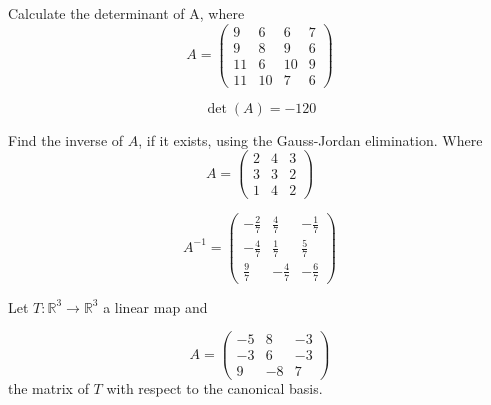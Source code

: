 \begin{questions}

\question Calculate the determinant of A, where
$$
A=\left(\begin{array}{rrrr}
9 & 6 & 6 & 7 \\
9 & 8 & 9 & 6 \\
11 & 6 & 10 & 9 \\
11 & 10 & 7 & 6
\end{array}\right)
$$

\begin{solution}
$$\det(A)=-120$$
\end{solution}

\question Find the inverse of $A$, if it exists, using the Gauss-Jordan elimination. Where
$$
A=\left(\begin{array}{rrr}
2 & 4 & 3 \\
3 & 3 & 2 \\
1 & 4 & 2
\end{array}\right)
$$

\begin{solution}
$$A^{-1}=\left(\begin{array}{rrr}
-\frac{2}{7} & \frac{4}{7} & -\frac{1}{7} \\
-\frac{4}{7} & \frac{1}{7} & \frac{5}{7} \\
\frac{9}{7} & -\frac{4}{7} & -\frac{6}{7}
\end{array}\right)$$
\end{solution}

\question Let $T:\mathbb{R}^3\rightarrow\mathbb{R}^3$  a linear map and
 
$$
A=\left(\begin{array}{rrr}
-5 & 8 & -3 \\
-3 & 6 & -3 \\
9 & -8 & 7
\end{array}\right)
$$
the matrix of $T$ with respect to the canonical basis.
\end{questions}
